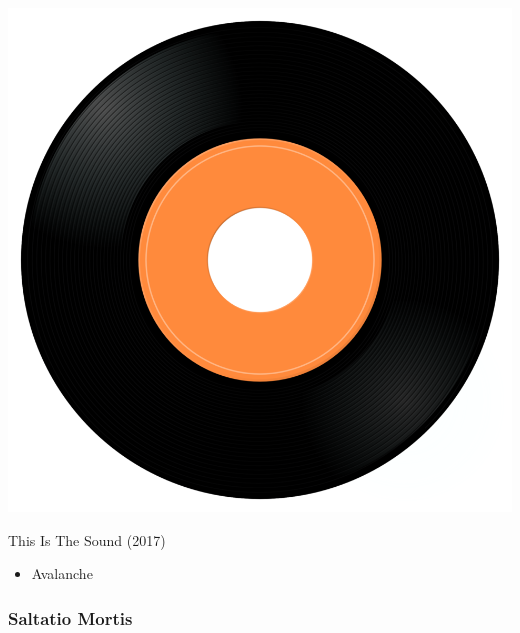 \begin{minipage}[t]{0.25\textwidth}\vspace{0pt}
\captionsetup{type=figure}
\includegraphics[width=\textwidth]{Images/cover.png}
\caption*{This Is The Sound (2017)}
\end{minipage}
\begin{minipage}[t]{0.25\textwidth}\vspace{0pt}
\begin{itemize}[nosep,leftmargin=1em,labelwidth=*,align=left]
	\setlength{\itemsep}{0pt}
	\item Avalanche
\end{itemize}
\end{minipage}

\subsubsection{Saltatio Mortis}

